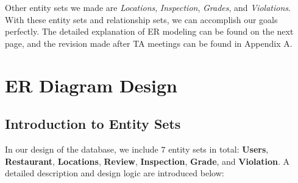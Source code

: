 \documentclass[a4paper,12pt]{article}
\theoremstyle{definition}
\begin{document}
\vspace{-0.4cm}
Other entity sets we made are \textit{Locations}, \textit{Inspection}, \textit{Grades}, and \textit{Violations}. With these entity sets and relationship sets, we can accomplish our goals perfectly. The detailed explanation of ER modeling can be found on the next page, and the revision made after TA meetings can be found in Appendix A.

\newpage
\section{ER Diagram Design}
\subsection{Introduction to Entity Sets}
In our design of the database, we include $7$ entity sets in total: \textbf{Users}, \textbf{Restaurant}, \textbf{Locations}, \textbf{Review}, \textbf{Inspection}, \textbf{Grade}, and \textbf{Violation}. A detailed description and design logic are introduced below:
\end{document}
